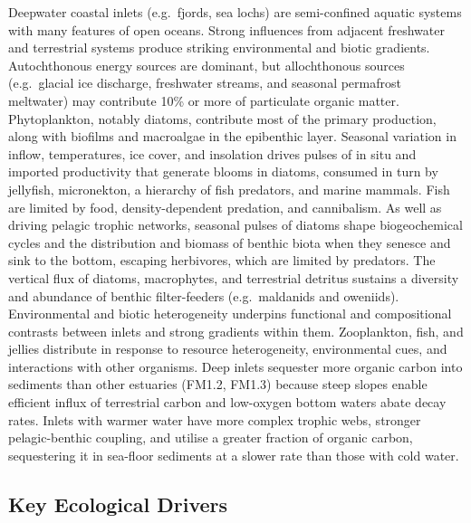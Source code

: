 \documentclass[
  letterpaper,
  DIV=11,
  numbers=noendperiod]{scrartcl}
\begin{document}
Deepwater coastal inlets (e.g.~fjords, sea lochs) are semi-confined
aquatic systems with many features of open oceans. Strong influences
from adjacent freshwater and terrestrial systems produce striking
environmental and biotic gradients. Autochthonous energy sources are
dominant, but allochthonous sources (e.g.~glacial ice discharge,
freshwater streams, and seasonal permafrost meltwater) may contribute
10\% or more of particulate organic matter. Phytoplankton, notably
diatoms, contribute most of the primary production, along with biofilms
and macroalgae in the epibenthic layer. Seasonal variation in inflow,
temperatures, ice cover, and insolation drives pulses of in situ and
imported productivity that generate blooms in diatoms, consumed in turn
by jellyfish, micronekton, a hierarchy of fish predators, and marine
mammals. Fish are limited by food, density-dependent predation, and
cannibalism. As well as driving pelagic trophic networks, seasonal
pulses of diatoms shape biogeochemical cycles and the distribution and
biomass of benthic biota when they senesce and sink to the bottom,
escaping herbivores, which are limited by predators. The vertical flux
of diatoms, macrophytes, and terrestrial detritus sustains a diversity
and abundance of benthic filter-feeders (e.g.~maldanids and oweniids).
Environmental and biotic heterogeneity underpins functional and
compositional contrasts between inlets and strong gradients within them.
Zooplankton, fish, and jellies distribute in response to resource
heterogeneity, environmental cues, and interactions with other
organisms. Deep inlets sequester more organic carbon into sediments than
other estuaries (FM1.2, FM1.3) because steep slopes enable efficient
influx of terrestrial carbon and low-oxygen bottom waters abate decay
rates. Inlets with warmer water have more complex trophic webs, stronger
pelagic-benthic coupling, and utilise a greater fraction of organic
carbon, sequestering it in sea-floor sediments at a slower rate than
those with cold water.

\subsection{Key Ecological Drivers}\label{key-ecological-drivers-131}
\end{document}
